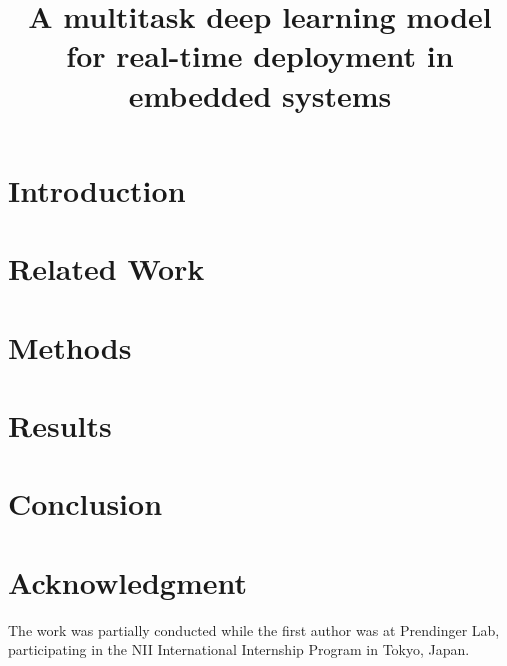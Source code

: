 \documentclass{SSBAtran}
\begin{document}
%
\title{A multitask deep learning model for real-time deployment in embedded systems}

\author{
}

\setlength{\textfloatsep}{10pt plus 1.0pt minus 2.0pt}

\maketitle

\begin{abstract}

\end{abstract}



\section{Introduction}


\section{Related Work}


\section{Methods}


\section{Results}



\section{Conclusion}



\section*{Acknowledgment}
The work was partially conducted while the first author was at Prendinger Lab, participating in the NII International Internship Program in Tokyo, Japan. 
\end{document}
